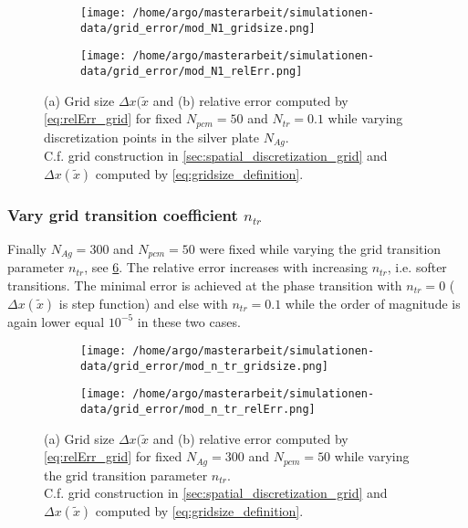 \documentclass{scrartcl}[12pt, halfparskip]
\numberwithin{equation}{section}
\numberwithin{figure}{section}
\numberwithin{table}{section}
\begin{document}
\begin{figure}[H]
	\begin{subfigure}{0.49\textwidth}
		\texttt{[image: /home/argo/masterarbeit/simulationen-data/grid\_error/mod\_N1\_gridsize.png]}
		\caption{}
		\label{fig:gridsize_mod_N1}
	\end{subfigure}
	\begin{subfigure}{0.49\textwidth}
		\texttt{[image: /home/argo/masterarbeit/simulationen-data/grid\_error/mod\_N1\_relErr.png]}
		\caption{}
		\label{fig:grid_relErr_mod_N1}
	\end{subfigure}
	\caption{(a) Grid size $\Delta x(\tilde{x}$ and (b) relative error computed by \cref{eq:relErr_grid} for fixed $N_{pcm}=50$ and $N_{tr}=0.1$ while varying discretization points in the silver plate $N_{Ag}$. \\
	C.f. grid construction in \cref{sec:spatial_discretization_grid} and $\Delta x(\tilde{x})$ computed by \cref{eq:gridsize_definition}.}
	\label{fig:grid_mod_N1}
\end{figure}


\subsubsection{Vary grid transition coefficient $n_{tr}$}
Finally $N_{Ag}=300$ and $N_{pcm}=50$ were fixed while varying the grid transition parameter $n_{tr}$, see \cref{fig:grid_mod_n_tr}. The relative error increases with increasing $n_{tr}$, i.e. softer transitions. The minimal error is achieved at the phase transition with $n_{tr}=0$ ($\Delta x(\tilde{x})$ is step function) and else with $n_{tr}=0.1$ while the order of magnitude is again lower equal $10^{-5}$ in these two cases.

\begin{figure}[H]
	\begin{subfigure}{0.49\textwidth}
		\texttt{[image: /home/argo/masterarbeit/simulationen-data/grid\_error/mod\_n\_tr\_gridsize.png]}
		\caption{}
		\label{fig:gridsize_mod_n_tr}
	\end{subfigure}
	\begin{subfigure}{0.49\textwidth}
		\texttt{[image: /home/argo/masterarbeit/simulationen-data/grid\_error/mod\_n\_tr\_relErr.png]}
		\caption{}
		\label{fig:grid_relErr_mod_n_tr}
	\end{subfigure}
	\caption{(a) Grid size $\Delta x(\tilde{x}$ and (b) relative error computed by \cref{eq:relErr_grid} for fixed $N_{Ag}=300$ and $N_{pcm}=50$ while varying the grid transition parameter $n_{tr}$. \\
	C.f. grid construction in \cref{sec:spatial_discretization_grid} and $\Delta x(\tilde{x})$ computed by \cref{eq:gridsize_definition}.}
	\label{fig:grid_mod_n_tr}
\end{figure}
\end{document}
